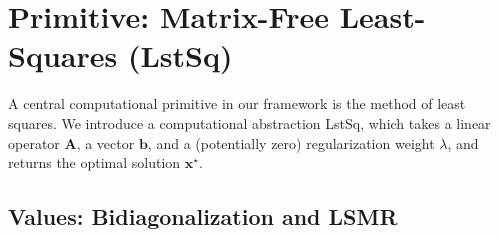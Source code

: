 

\section{Primitive: Matrix-Free Least-Squares (\textsf{LstSq})}
\label{sec:lstsq_primitive}

A central computational primitive in our framework is the method of least squares. We introduce a computational abstraction \textsf{LstSq}, which takes a linear operator $\mathbf{A}$, a vector $\mathbf{b}$, and a (potentially zero) regularization weight $\lambda$, and returns the optimal solution $\mathbf{x}^\star$.

\subsection{Values: Bidiagonalization and LSMR}

